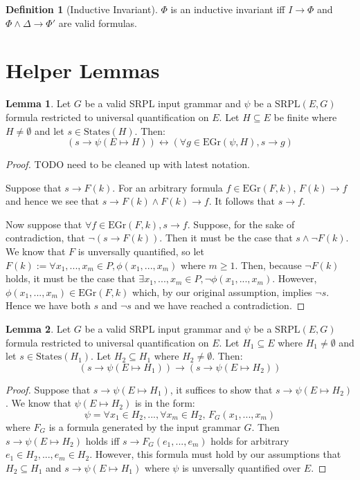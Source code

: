 \documentclass[12pt]{article}
\theoremstyle{definition}
\newtheorem{lemma}{Lemma}
\newtheorem{definition}{Definition}
\theoremstyle{remark}
\newcommand{\states}{\text{States}}
\newcommand{\gr}{\text{EGr}}
\newcommand{\SRPL}{\text{SRPL}}
\begin{document}
\begin{definition}[Inductive Invariant]
  $\Phi$ is an inductive invariant iff $I \rightarrow \Phi$ and $\Phi \land \Delta \rightarrow \Phi'$ are valid formulas.
\end{definition}



\section{Helper Lemmas}
\begin{lemma}
  \label{lem:pnf-ground}
  Let $G$ be a valid SRPL input grammar and $\psi$ be a $\SRPL(E,G)$ formula restricted to universal quantification on $E$.  Let $H \subseteq E$ be finite where $H \neq \emptyset$ and let $s \in \states(H)$.  Then:
  $$(s \rightarrow \psi(E \mapsto H)) \leftrightarrow (\forall g \in \gr(\psi,H), s \rightarrow g)$$
\end{lemma}
\begin{proof}
  TODO need to be cleaned up with latest notation.

  Suppose that $s \rightarrow F(k)$.  For an arbitrary formula $f \in \gr(F,k)$, $F(k) \rightarrow f$ and hence we see that $s \rightarrow F(k) \land F(k) \rightarrow f$.  It follows that $s \rightarrow f$.

  Now suppose that $\forall f \in \gr(F,k), s \rightarrow f$.  Suppose, for the sake of contradiction, that $\neg(s \rightarrow F(k))$.  Then it must be the case that $s \land \neg F(k)$.  We know that $F$ is unversally quantified, so let $F(k) := \forall x_1,...,x_m \in P, \phi(x_1,...,x_m)$ where $m \geq 1$.  Then, because $\neg F(k)$ holds, it must be the case that $\exists x_1,...,x_m \in P, \neg \phi(x_1,...,x_m)$.  However, $\phi(x_1,...,x_m) \in \gr(F,k)$ which, by our original assumption, implies $\neg s$.  Hence we have both $s$ and $\neg s$ and we have reached a contradiction.
\end{proof}

\begin{lemma}
  \label{lem:forall-lower}
  Let $G$ be a valid SRPL input grammar and $\psi$ be a $\SRPL(E,G)$ formula restricted to universal quantification on $E$.  Let $H_1 \subseteq E$ where $H_1 \neq \emptyset$ and let $s \in \states(H_1)$.  Let $H_2 \subseteq H_1$ where $H_2 \neq \emptyset$.  Then:
  $$(s \rightarrow \psi(E \mapsto H_1)) \rightarrow (s \rightarrow \psi(E \mapsto H_2))$$
\end{lemma}
\begin{proof}
  Suppose that $s \rightarrow \psi(E \mapsto H_1)$, it suffices to show that $s \rightarrow \psi(E \mapsto H_2)$.  We know that $\psi(E \mapsto H_2)$ is in the form:
  $$\psi = \forall x_1 \in H_2,...,\forall x_m \in H_2, \, F_G(x_1,...,x_m)$$
  where $F_G$ is a formula generated by the input grammar $G$.  Then $s \rightarrow \psi(E \mapsto H_2)$ holds iff $s \rightarrow F_G(e_1,...,e_m)$ holds for arbitrary $e_1 \in H_2,...,e_m \in H_2$.  However, this formula must hold by our assumptions that $H_2 \subseteq H_1$ and $s \rightarrow \psi(E \mapsto H_1)$ where $\psi$ is unversally quantified over $E$.
\end{proof}
\end{document}

